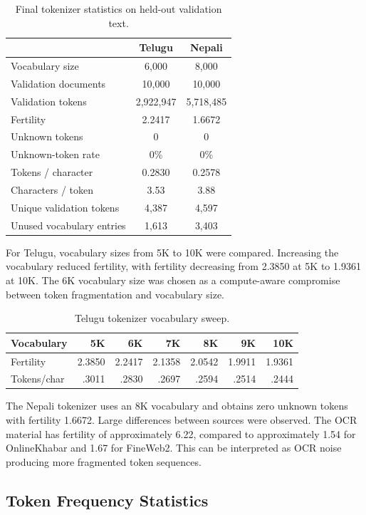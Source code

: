 \documentclass[10pt,a4paper]{article}
\begin{document}
\begin{table}[H]
\centering
\small
\caption{Final tokenizer statistics on held-out validation text.}
\begin{tabular}{lcc}
\toprule
 & \textbf{Telugu} & \textbf{Nepali}\\
\midrule
Vocabulary size & 6,000 & 8,000\\
Validation documents & 10,000 & 10,000\\
Validation tokens & 2,922,947 & 5,718,485\\
Fertility & 2.2417 & 1.6672\\
Unknown tokens & 0 & 0\\
Unknown-token rate & 0\% & 0\%\\
Tokens / character & 0.2830 & 0.2578\\
Characters / token & 3.53 & 3.88\\
Unique validation tokens & 4,387 & 4,597\\
Unused vocabulary entries & 1,613 & 3,403\\
\bottomrule
\end{tabular}
\end{table}

For Telugu, vocabulary sizes from 5K to 10K were compared. Increasing
the vocabulary reduced fertility, with fertility decreasing from
2.3850 at 5K to 1.9361 at 10K. The 6K vocabulary size was chosen as a
compute-aware compromise between token fragmentation and vocabulary
size.

\begin{table}[H]
\centering
\small
\caption{Telugu tokenizer vocabulary sweep.}
\begin{tabular}{lrrrrrr}
\toprule
Vocabulary & 5K & 6K & 7K & 8K & 9K & 10K\\
\midrule
Fertility
& 2.3850
& 2.2417
& 2.1358
& 2.0542
& 1.9911
& 1.9361\\
Tokens/char
& .3011
& .2830
& .2697
& .2594
& .2514
& .2444\\
\bottomrule
\end{tabular}
\end{table}

The Nepali tokenizer uses an 8K vocabulary and obtains zero unknown
tokens with fertility 1.6672. Large differences between sources were
observed. The OCR material has fertility of approximately 6.22,
compared to approximately 1.54 for OnlineKhabar and 1.67 for
FineWeb2. This can be interpreted as OCR noise producing more
fragmented token sequences.

\subsection{Token Frequency Statistics}
\end{document}
